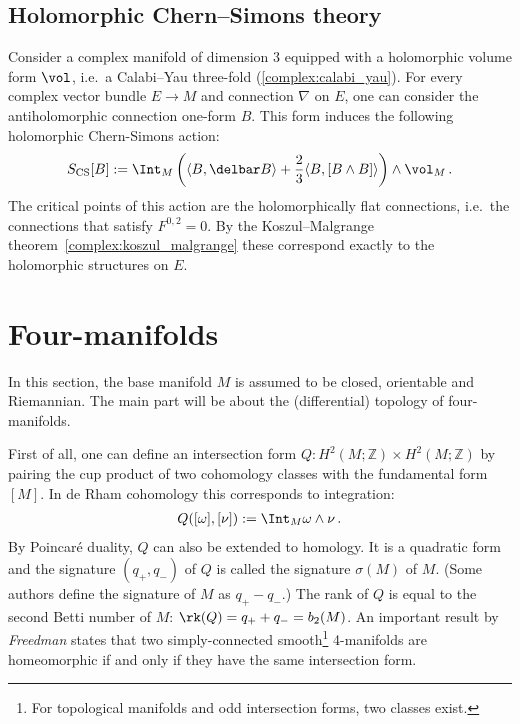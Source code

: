 \subsection{Holomorphic Chern--Simons theory}

    Consider a complex manifold of dimension 3 equipped with a holomorphic volume form $\vol$, i.e.~a Calabi--Yau three-fold (\cref{complex:calabi_yau}). For every complex vector bundle $E\rightarrow M$ and connection $\nabla$ on $E$, one can consider the antiholomorphic connection one-form $B$. This form induces the following holomorphic Chern-Simons action:
    \begin{gather}
        S_{\text{CS}}[B]:=\Int_M\left(\langle B,\delbar B \rangle+\frac{2}{3}
        \langle B,[B\wedge B] \rangle\right)\wedge\vol_M\,.
    \end{gather}
    The critical points of this action are the holomorphically flat connections, i.e.~the connections that satisfy $F^{0,2}=0$. By the Koszul--Malgrange theorem~\ref{complex:koszul_malgrange} these correspond exactly to the holomorphic structures on $E$.

\section{Four-manifolds}

    In this section, the base manifold $M$ is assumed to be closed, orientable and Riemannian. The main part will be about the (differential) topology of four-manifolds.

    First of all, one can define an intersection form $Q:H^2(M;\mathbb{Z})\times H^2(M;\mathbb{Z})$ by pairing the cup product of two cohomology classes with the fundamental form $[M]$. In de Rham cohomology this corresponds to integration:
    \begin{gather}
        Q([\omega],[\nu]) := \Int_M\omega\wedge\nu\,.
    \end{gather}
    By Poincar\'e duality, $Q$ can also be extended to homology. It is a quadratic form and the signature $(q_+,q_-)$ of $Q$ is called the signature $\sigma(M)$ of $M$. (Some authors define the signature of $M$ as $q_+-q_-$.) The rank of $Q$ is equal to the second Betti number of $M$: $\rk(Q)=q_++q_-=b_2(M)$. An important result by \textit{Freedman} states that two simply-connected smooth\footnote{For topological manifolds and odd intersection forms, two classes exist.} 4-manifolds are homeomorphic if and only if they have the same intersection form.

